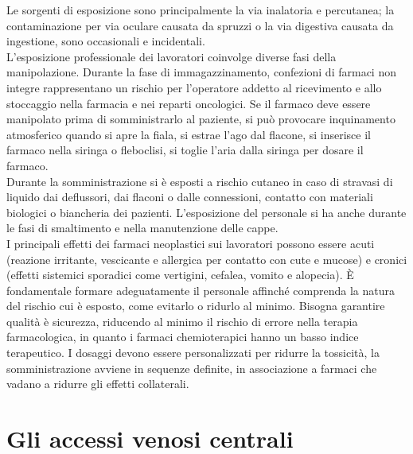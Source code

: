 Le sorgenti di esposizione sono principalmente la via inalatoria e percutanea; la contaminazione per via oculare 
causata da spruzzi o la via digestiva causata da ingestione, sono occasionali e incidentali\cite{FNOPI}.\\ 
L’esposizione professionale dei lavoratori coinvolge diverse fasi della manipolazione. Durante la fase di 
immagazzinamento, confezioni di farmaci non integre rappresentano un rischio per l’operatore addetto al ricevimento e 
allo stoccaggio nella farmacia e nei reparti oncologici. Se il farmaco deve essere manipolato prima di somministrarlo 
al paziente, si può provocare inquinamento atmosferico quando si apre la fiala, si estrae l’ago dal flacone, 
si inserisce il farmaco nella siringa o fleboclisi, si toglie l’aria dalla siringa per dosare il farmaco\cite{FNOPI}.\\ 
Durante la somministrazione si è esposti a rischio cutaneo in caso di stravasi di liquido dai deflussori, 
dai flaconi o dalle connessioni, contatto con materiali biologici o biancheria dei pazienti. 
L’esposizione del personale si ha anche durante le fasi di smaltimento e nella manutenzione delle cappe\cite{FNOPI}.\\
I principali effetti dei farmaci neoplastici sui lavoratori possono essere acuti (reazione irritante, vescicante e 
allergica per contatto con cute e mucose) e cronici (effetti sistemici sporadici come vertigini, cefalea, vomito e 
alopecia). È fondamentale formare adeguatamente il personale affinché comprenda la natura del rischio cui è esposto, 
come evitarlo o ridurlo al minimo. Bisogna garantire qualità è sicurezza, riducendo al minimo il rischio di errore 
nella terapia farmacologica, in quanto i farmaci chemioterapici hanno un basso indice terapeutico. I dosaggi devono 
essere personalizzati per ridurre la tossicità, la somministrazione avviene in sequenze definite, 
in associazione a farmaci che vadano a ridurre gli effetti collaterali\cite{ISSESPO}.

\section{Gli accessi venosi centrali}

